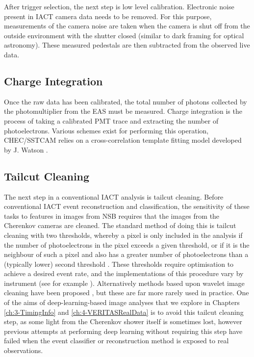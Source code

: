 After trigger selection, the next step is low level calibration. Electronic noise present in IACT camera data needs to be removed. For this purpose, measurements of the camera noise are taken when the camera is shut off from the outside environment with the shutter closed (similar to dark framing for optical astronomy). These measured pedestals are then subtracted from the observed live data.

\subsection{Charge Integration}

Once the raw data has been calibrated, the total number of photons collected by the photomultiplier from the EAS must be measured. Charge integration is the process of taking a calibrated PMT trace and extracting the number of photoelectrons. Various schemes exist for performing this operation, CHEC/SSTCAM relies on a cross-correlation template fitting model developed by J. Watson \cite{jasonthesis}.

\subsection{Tailcut Cleaning}

The next step in a conventional IACT analysis is tailcut cleaning. Before conventional IACT event reconstruction and classification, the sensitivity of these tasks to features in images from NSB requires that the images from the Cherenkov cameras are cleaned. The standard method of doing this is tailcut cleaning with two thresholds, whereby a pixel is only included in the analysis if the number of photoelectrons in the pixel exceeds a given threshold, or if it is the neighbour of such a pixel and also has a greater number of photoelectrons than a (typically lower) second threshold \cite{hegratailcut}. These thresholds require optimisation to achieve a desired event rate, and the implementations of this procedure vary by instrument (see for example \cite{magictailcut} \cite{Benbow} \cite{magictime}). Alternatively methods based upon wavelet image cleaning have been proposed \cite{wavelet}, but these are far more rarely used in practice. One of the aims of deep-learning-based image analyses that we explore in Chapters \ref{ch:3-TimingInfo} and \ref{ch:4-VERITASRealData} is to avoid this tailcut cleaning step, as some light from the Cherenkov shower itself is sometimes lost, however previous attempts at performing deep learning without requiring this step have failed when the event classifier or reconstruction method is exposed to real observations. 

